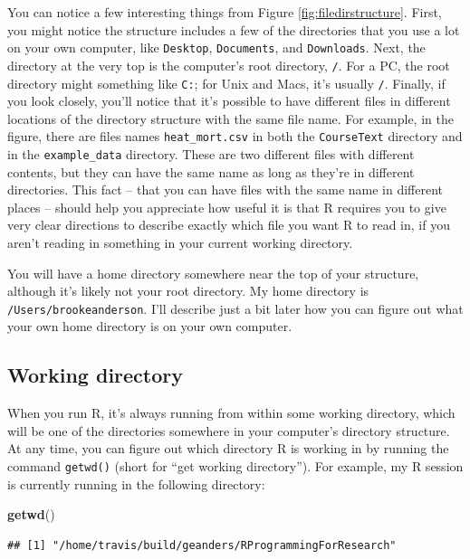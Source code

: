 \documentclass[]{book}
\makeatletter
\newenvironment{Shaded}{\begin{snugshade}}{\end{snugshade}}
\newcommand{\KeywordTok}[1]{\textcolor[rgb]{0.13,0.29,0.53}{\textbf{#1}}}
\newcommand{\NormalTok}[1]{#1}
\newenvironment{kframe}{%
\medskip{}
\setlength{\fboxsep}{.8em}
 \def\at@end@of@kframe{}%
 \ifinner\ifhmode%
  \def\at@end@of@kframe{\end{minipage}}%
  \begin{minipage}{\columnwidth}%
 \fi\fi%
 \def\FrameCommand##1{\hskip\@totalleftmargin \hskip-\fboxsep
 \colorbox{shadecolor}{##1}\hskip-\fboxsep
     \hskip-\linewidth \hskip-\@totalleftmargin \hskip\columnwidth}%
 \MakeFramed {\advance\hsize-\width
   \@totalleftmargin\z@ \linewidth\hsize
   \@setminipage}}%
 {\par\unskip\endMakeFramed%
 \at@end@of@kframe}
\renewenvironment{Shaded}{\begin{kframe}}{\end{kframe}}
\theoremstyle{definition}
\theoremstyle{definition}
\theoremstyle{definition}
\theoremstyle{remark}
\makeatother
\begin{document}
You can notice a few interesting things from Figure
\ref{fig:filedirstructure}. First, you might notice the structure
includes a few of the directories that you use a lot on your own
computer, like \texttt{Desktop}, \texttt{Documents}, and
\texttt{Downloads}. Next, the directory at the very top is the
computer's root directory, \texttt{/}. For a PC, the root directory
might something like \texttt{C:}; for Unix and Macs, it's usually
\texttt{/}. Finally, if you look closely, you'll notice that it's
possible to have different files in different locations of the directory
structure with the same file name. For example, in the figure, there are
files names \texttt{heat\_mort.csv} in both the \texttt{CourseText}
directory and in the \texttt{example\_data} directory. These are two
different files with different contents, but they can have the same name
as long as they're in different directories. This fact -- that you can
have files with the same name in different places -- should help you
appreciate how useful it is that R requires you to give very clear
directions to describe exactly which file you want R to read in, if you
aren't reading in something in your current working directory.

You will have a home directory somewhere near the top of your structure,
although it's likely not your root directory. My home directory is
\texttt{/Users/brookeanderson}. I'll describe just a bit later how you
can figure out what your own home directory is on your own computer.

\subsection{Working directory}\label{working-directory}

When you run R, it's always running from within some working directory,
which will be one of the directories somewhere in your computer's
directory structure. At any time, you can figure out which directory R
is working in by running the command \texttt{getwd()} (short for ``get
working directory''). For example, my R session is currently running in
the following directory:

\begin{Shaded}
\begin{Highlighting}[]
\KeywordTok{getwd}\NormalTok{()}
\end{Highlighting}
\end{Shaded}

\begin{verbatim}
## [1] "/home/travis/build/geanders/RProgrammingForResearch"
\end{verbatim}
\end{document}
